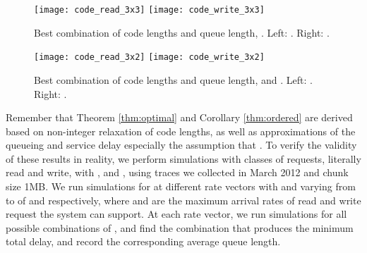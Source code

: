 \documentclass[journal]{IEEEtran}
\begin{document}
\begin{figure}[t]
\centering
\texttt{[image: code\_read\_3x3]}
\texttt{[image: code\_write\_3x3]}
\vspace{-20pt}
\caption{Best combination of code lengths and queue length, . Left: . Right: .}
\label{fig:code_3x3}
\vspace{-5pt}
\end{figure}

\begin{figure}[t]
\centering
\texttt{[image: code\_read\_3x2]}
\texttt{[image: code\_write\_3x2]}
\vspace{-20pt}
\caption{Best combination of code lengths and queue length,  and . Left: . Right: .}
\label{fig:code_3x2}
\vspace{-15pt}
\end{figure}


Remember that Theorem \ref{thm:optimal} and Corollary \ref{thm:ordered} are derived based on non-integer relaxation of code lengths, as well as approximations of the queueing and service delay especially the assumption that . To verify the validity of these results in reality, we perform simulations with  classes of requests, literally read and write, with ,  and , using traces we collected in March 2012 and chunk size 1MB. We run simulations for at different rate vectors  with  and  varying from  to  of  and  respectively, where
 and 
 are the maximum arrival rates of read and write request the system can support. At each rate vector, we  run simulations for all  possible combinations of , and find the combination that produces the minimum total delay, and record the corresponding average queue length.
\end{document}
